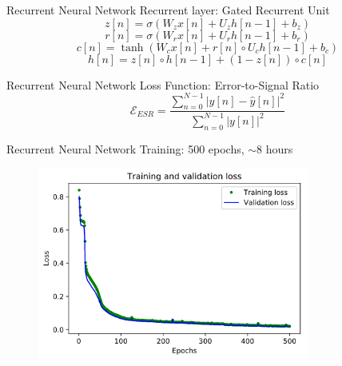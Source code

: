 \begin{frame}{Recurrent Neural Network}
    Recurrent layer: Gated Recurrent Unit
    \begin{equation}
        z[n] = \sigma(W_z x[n] + U_z h[n-1] + b_z)
    \end{equation}
    \begin{equation}
        r[n] = \sigma(W_r x[n] + U_r h[n-1] + b_r)
    \end{equation}
    \begin{equation}
        c[n] = \tanh(W_c x[n] + r[n] \circ U_c h[n-1] + b_c)
    \end{equation}
    \begin{equation}
        h[n] = z[n] \circ h[n-1] + (1 - z[n]) \circ c[n]
    \end{equation}
\end{frame}

\begin{frame}{Recurrent Neural Network}
    Loss Function: Error-to-Signal Ratio
    \begin{equation}
        \mathcal{E}_{ESR} = \frac{\sum_{n=0}^{N-1} |y[n] - \hat{y}[n]|^2}{\sum_{n=0}^{N-1} |y[n]|^2}
    \end{equation}
\end{frame}

\begin{frame}{Recurrent Neural Network}
    Training: 500 epochs, $\sim 8$ hours
    \begin{figure}
        \centering
        \includegraphics[height=2.5in]{../Paper/Figures/Training.png}
    \end{figure}
\end{frame}

